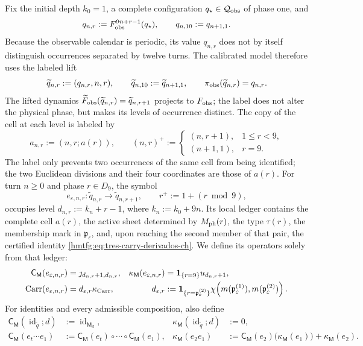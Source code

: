 Fix the initial depth \(k_0=1\), a complete configuration
\(q_\star\in\mathcal Q_{\rm obs}\) of phase one, and
\[
 q_{n,r}:=F_{\rm obs}^{9n+r-1}(q_\star),\qquad
 q_{n,10}:=q_{n+1,1}.
\]
Because the observable calendar is periodic, its value \(q_{n,r}\) does not
by itself distinguish occurrences separated by twelve turns. The calibrated
model therefore uses the labeled lift
\[
 \widetilde q_{n,r}:=(q_{n,r},n,r),\qquad
 \widetilde q_{n,10}:=\widetilde q_{n+1,1},\qquad
 \pi_{\rm obs}(\widetilde q_{n,r})=q_{n,r}.
\]
The lifted dynamics
\(\widetilde F_{\rm obs}(\widetilde q_{n,r})
=\widetilde q_{n,r+1}\) projects to \(F_{\rm obs}\); the label does not alter the physical phase, but makes its
levels of occurrence distinct. The copy of the cell at each level is labeled by
\[
 a_{n,r}:=(n,r;a(r)),\qquad
 (n,r)^+:=
 \begin{cases}
  (n,r+1),&1\le r<9,\\
  (n+1,1),&r=9.
 \end{cases}
\]
The label only prevents two occurrences of the same cell from being
identified; the two Euclidean divisions and their four coordinates are those
of \(a(r)\). For turn \(n\ge0\) and phase \(r\in D_9\), the symbol
\[
 e_{\varepsilon,n,r}:\widetilde q_{n,r}
 \longrightarrow\widetilde q_{n,r+1},
 \qquad r^+:=1+(r\bmod9),
\]
occupies level \(d_{n,r}:=k_n+r-1\), where \(k_n:=k_0+9n\). Its local ledger
contains the complete cell \(a(r)\), the active sheet determined by
\(M_{\rm ph}(r)\), the type \(\tau(r)\), the membership mark in
\(\mathfrak p_\varepsilon\), and, upon reaching the second member of that
pair, the certified identity \eqref{hmtfg:eq:tres-carry-derivados-ch}. We define its
operators solely from that ledger:
\begin{align}
 \mathsf C_{\mathsf M}(e_{\varepsilon,n,r})
   &=\jmath_{d_{n,r}+1,d_{n,r}},&
 \kappa_{\mathsf M}(e_{\varepsilon,n,r})
   &=\mathbf1_{\{r=9\}}u_{d_{n,r}+1},
 \label{hmtfg:eq:memoria-arista-ch}\\
       \operatorname{Carr}(e_{\varepsilon,n,r})
   &=d_{\varepsilon,r}\kappa_{\rm Carr},&
 d_{\varepsilon,r}
   &:=\mathbf1_{\{r=\mathfrak p_\varepsilon^{(2)}\}}
       \chi\!\left(m(\mathfrak p_\varepsilon^{(1)}),
                    m(\mathfrak p_\varepsilon^{(2)})\right).
 \label{hmtfg:eq:carry-arista-derivado-ch}
\end{align}
For identities and every admissible composition, also define
\begin{align}
 \mathsf C_{\mathsf M}(\operatorname{id}_{\widetilde q};d)
   &:=\operatorname{id}_{\mathsf M_d},&
 \kappa_{\mathsf M}(\operatorname{id}_{\widetilde q};d)&:=0,
 \label{hmtfg:eq:memoria-identidad-ch}\\
 \mathsf C_{\mathsf M}(e_t\cdots e_1)
   &:=\mathsf C_{\mathsf M}(e_t)\circ\cdots\circ
      \mathsf C_{\mathsf M}(e_1),&
 \kappa_{\mathsf M}(e_2e_1)
   &:=\mathsf C_{\mathsf M}(e_2)
        \bigl(\kappa_{\mathsf M}(e_1)\bigr)
      +\kappa_{\mathsf M}(e_2).
 \label{hmtfg:eq:cociclo-memoria-calibrado-ch}
\end{align}
